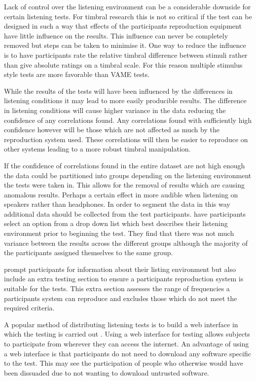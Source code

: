 			Lack of control over the listening environment can be a considerable downside for certain listening
			tests.  For timbral research this is not so critical if the test can be designed in such a way that
			effects of the participants reproduction equipment have little influence on the results. This
			influence can never be completely removed but steps can be taken to minimise it. One way to reduce
			the influence is to have participants rate the relative timbral difference between stimuli rather
			than give absolute ratings on a timbral scale. For this reason multiple stimulus style tests are
			more favorable than VAME tests.

			While the results of the tests will have been influenced by the differences in listening conditions
			it may lead to more easily producible results. The difference in listening conditions will cause
			higher variance in the data reducing the confidence of any correlations found. Any correlations
			found with sufficiently high confidence however will be those which are not affected as much by the
			reproduction system used. These correlations will then be easier to reproduce on other systems
			leading to a more robust timbral manipulation.

			If the confidence of correlations found in the entire dataset are not high enough the data could be
			partitioned into groups depending on the listening environment the tests were taken in. This allows
			for the removal of results which are causing anomalous results. Perhaps a certain effect in more
			audible when listening on speakers rather than headphones. In order to segment the data in this way
			additional data should be collected from the test participants.  \citet{wilmering2013audio} have
			participants select an option from a drop down list which best describes their listening environment
			prior to beginning the test.  They find that there was not much variance between the results across
			the different groups although the majority of the participants assigned themselves to the same
			group.

			\citet{seetharaman2014crowdsourcing} prompt participants for information about their listing
			environment but also include an extra testing section to ensure a participants reproduction system
			is suitable for the tests. This extra section assesses the range of frequencies a participants
			system can reproduce and excludes those which do not meet the required criteria.
			
			A popular method of distributing listening tests is to build a web interface in which the testing is
			carried out \citep{wilmering2013audio, cartwright2013socialeq, seetharaman2014crowdsourcing}. Using
			a web interface for testing allows subjects to participate from wherever they can access the
			internet. An advantage of using a web interface is that participants do not need to download any
			software specific to the test.  This may see the participation of people who otherwise would have
			been dissuaded due to not wanting to download untrusted software.

